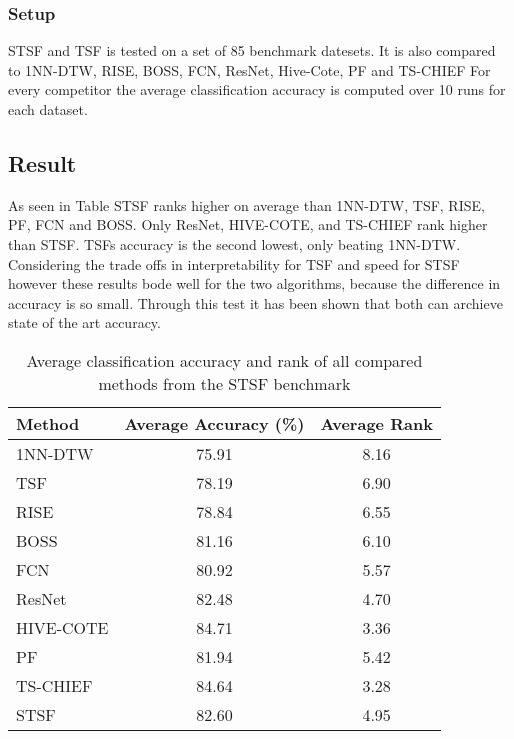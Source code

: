 \subsubsection*{Setup}
STSF and TSF is tested on a set of 85 benchmark datesets. %
It is also compared to 1NN-DTW, RISE, BOSS, FCN, ResNet, Hive-Cote, PF and TS-CHIEF %
For every competitor the average classification accuracy is computed over 10 runs for each dataset.

\subsection*{Result}
As seen in Table  STSF ranks higher on average than 1NN-DTW, TSF, RISE, PF, FCN and BOSS.
Only ResNet, HIVE-COTE, and TS-CHIEF rank higher than STSF. 
TSFs accuracy is the second lowest, only beating 1NN-DTW. 
Considering the trade offs in interpretability for TSF and speed for STSF however these results bode well for the two algorithms, because the 
difference in accuracy is so small. Through this test it has been shown that both can archieve state of the 
art accuracy.
\begin{table}[h]
\centering
\caption{Average classification accuracy and rank of all compared methods from the STSF benchmark}
\label{tab:stsf_full_results}
\begin{tabular}{lcc}
\toprule
\textbf{Method} & \textbf{Average Accuracy (\%)} & \textbf{Average Rank} \\
\midrule
1NN-DTW     & 75.91 & 8.16 \\
TSF         & 78.19 & 6.90 \\
RISE        & 78.84 & 6.55 \\
BOSS        & 81.16 & 6.10 \\
FCN         & 80.92 & 5.57 \\
ResNet      & 82.48 & 4.70 \\
HIVE-COTE   & 84.71 & 3.36 \\
PF          & 81.94 & 5.42 \\
TS-CHIEF    & 84.64 & 3.28 \\
STSF        & 82.60 & 4.95 \\
\bottomrule
\end{tabular}
\end{table}

